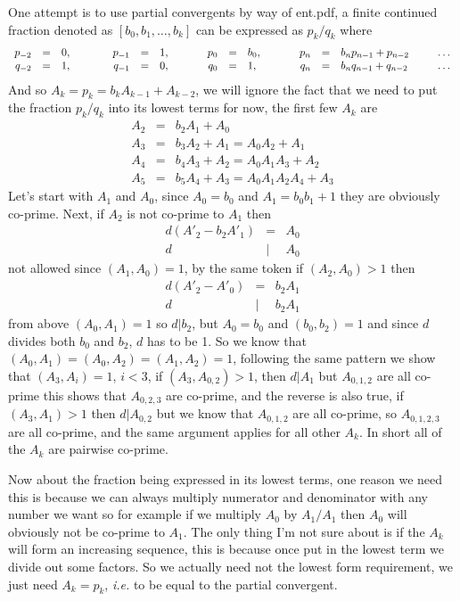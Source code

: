 \documentclass[aps,preprint,preprintnumbers,nofootinbib,showpacs,prd]{revtex4-1}
\newcommand{\ie}{{\it i.e.} }
\newcommand{\nbea}{\begin{eqnarray*}}
\newcommand{\neea}{\end{eqnarray*}}
\begin{document}
One attempt is to use partial convergents by way of ent.pdf, a finite continued fraction denoted as $[b_0, b_1, \dots, b_k]$ can be expressed as $p_k/q_k$ where
%
\nbea
\begin{array}{r c l c r c l c r c l c r c l c}
p_{-2} & = & 0, & ~~~~~~ & p_{-1} & = & 1, & ~~~~~ & p_0 & = & b_0, & ~~~~~ & p_n & = & b_np_{n-1} + p_{n-2} & ~~~~~ \dots \\
q_{-2} & = & 1, & ~~~~~~ & q_{-1} & = & 0, & ~~~~~ & q_0 & = & 1, & ~~~~~ & q_n & = & b_nq_{n-1} + q_{n-2} & ~~~~~ \dots
\end{array}
\neea
%
And so $A_k = p_k = b_k A_{k-1} + A_{k-2}$, we will ignore the fact that we need to put the fraction $p_k/q_k$ into its lowest terms for now, the first few $A_k$ are
%
\nbea
A_2 & = & b_2 A_1 + A_0 \\
A_3 & = & b_3 A_2 + A_1 = A_0A_2 + A_1 \\
A_4 & = & b_4 A_3 + A_2 = A_0A_1A_3 + A_2 \\
A_5 & = & b_5 A_4 + A_3 = A_0A_1A_2A_4 + A_3
\neea
%
Let's start with $A_1$ and $A_0$, since $A_0 = b_0$ and $A_1 = b_0b_1 + 1$ they are obviously co-prime. Next, if $A_2$ is not co-prime to $A_1$ then
%
\nbea
d(A'_2 - b_2A'_1) & = & A_0 \\
d &|& A_0
\neea
%
not allowed since $(A_1,A_0) = 1$, by the same token if $(A_2, A_0) > 1$ then
%
\nbea
d(A'_2 - A'_0) & = & b_2A_1 \\
d &|& b_2A_1
\neea
%
from above $(A_0, A_1) = 1$ so $d|b_2$, but $A_0 = b_0$ and $(b_0,b_2)=1$ and since $d$ divides both $b_0$ and $b_2$, $d$ has to be 1. So we know that $(A_0,A_1) = (A_0,A_2) = (A_1,A_2) = 1$, following the same pattern we show that $(A_3, A_i) = 1$, $i < 3$, if $(A_3, A_{0,2}) > 1$, then $d|A_1$ but $A_{0,1,2}$ are all co-prime this shows that $A_{0,2,3}$ are co-prime, and the reverse is also true, if $(A_3,A_1)>1$ then $d|A_{0,2}$ but we know that $A_{0,1,2}$ are all co-prime, so $A_{0,1,2,3}$ are all co-prime, and the same argument applies for all other $A_k$. In short all of the $A_k$ are pairwise co-prime.

Now about the fraction being expressed in its lowest terms, one reason we need this is because we can always multiply numerator and denominator with any number we want so for example if we multiply $A_0$ by $A_1/A_1$ then $A_0$ will obviously not be co-prime to $A_1$. The only thing I'm not sure about is if the $A_k$ will form an increasing sequence, this is because once put in the lowest term we divide out some factors. So we actually need not the lowest form requirement, we just need $A_k = p_k$, \ie to be equal to the partial convergent.
\end{document}
